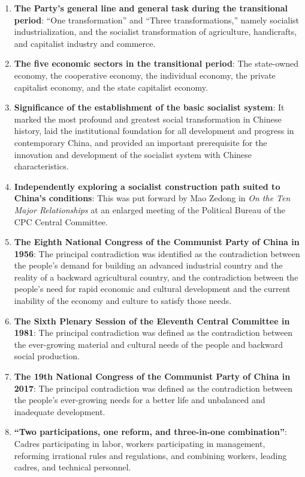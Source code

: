 \documentclass[11pt,a4paper]{ctexart}
\begin{document}
\begin{enumerate}[leftmargin=2em]
    \item \textbf{The Party's general line and general task during the transitional period}: ``One transformation'' and ``Three transformations,'' namely socialist industrialization, and the socialist transformation of agriculture, handicrafts, and capitalist industry and commerce.
    
    \item \textbf{The five economic sectors in the transitional period}: The state-owned economy, the cooperative economy, the individual economy, the private capitalist economy, and the state capitalist economy.
    
    \item \textbf{Significance of the establishment of the basic socialist system}: It marked the most profound and greatest social transformation in Chinese history, laid the institutional foundation for all development and progress in contemporary China, and provided an important prerequisite for the innovation and development of the socialist system with Chinese characteristics.
    
    \item \textbf{Independently exploring a socialist construction path suited to China's conditions}: This was put forward by Mao Zedong in \textit{On the Ten Major Relationships} at an enlarged meeting of the Political Bureau of the CPC Central Committee.
    
    \item \textbf{The Eighth National Congress of the Communist Party of China in 1956}: The principal contradiction was identified as the contradiction between the people's demand for building an advanced industrial country and the reality of a backward agricultural country, and the contradiction between the people's need for rapid economic and cultural development and the current inability of the economy and culture to satisfy those needs.
    
    \item \textbf{The Sixth Plenary Session of the Eleventh Central Committee in 1981}: The principal contradiction was defined as the contradiction between the ever-growing material and cultural needs of the people and backward social production.
    
    \item \textbf{The 19th National Congress of the Communist Party of China in 2017}: The principal contradiction was defined as the contradiction between the people's ever-growing needs for a better life and unbalanced and inadequate development.
    
    \item \textbf{``Two participations, one reform, and three-in-one combination''}: Cadres participating in labor, workers participating in management, reforming irrational rules and regulations, and combining workers, leading cadres, and technical personnel.
\end{enumerate}
\end{document}
